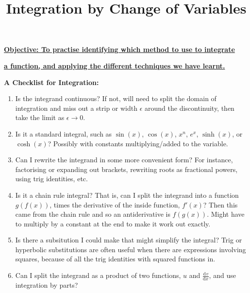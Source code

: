 \documentclass{article}
\newcommand{\deriv}[3][]{\frac{\mathrm{d}^{#1}#2}{\mathrm{d}#3^{#1}}}
\begin{document}
\title{Integration by Change of Variables}
\date{}

\maketitle
\thispagestyle{empty}

\Large

\textbf{\underline{Objective: To practise identifying which method to use to integrate}}

\textbf{\underline{a function, and applying the different techniques we have learnt.}}







\vspace{5mm}



\textbf{A Checklist for Integration:}\bigskip

\begin{enumerate}
	\item Is the integrand continuous? If not, will need to split the domain of integration and miss out a strip or width $\epsilon$ around the discontinuity, then take the limit as $\epsilon\to 0$.
	\item Is it a standard integral, such as $\sin(x)$, $\cos(x)$, $x^n$, $e^x$, $\sinh(x)$, or $\cosh(x)$? Possibly with constants multiplying/added to the variable.
	\item Can I rewrite the integrand in some more convenient form? For instance, factorising or expanding out brackets, rewriting roots as fractional powers, using trig identities, etc.
	\item Is it a chain rule integral? That is, can I split the integrand into a function $g(f(x))$, times the derivative of the inside function, $f'(x)$? Then this came from the chain rule and so an antiderivative is $f(g(x))$. Might have to multiply by a constant at the end to make it work out exactly.
	\item Is there a subsitution I could make that might simplify the integral? Trig or hyperbolic substitutions are often useful when there are expressions involving squares, because of all the trig identities with squared functions in.
	\item Can I split the integrand as a product of two functions, $u$ and $\deriv{v}{x}$, and use integration by parts?
\end{enumerate}

\clearpage
\end{document}
